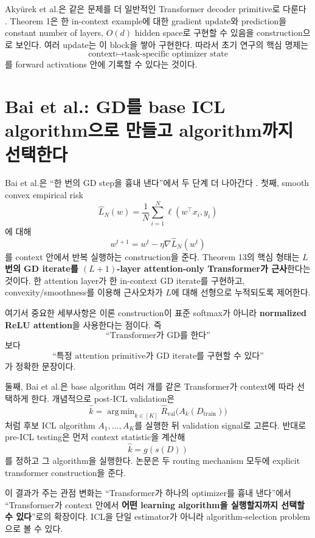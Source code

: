 \documentclass[11pt,a4paper,oneside,openany]{memoir}
\DeclareMathOperator*{\argmin}{arg\,min}
\theoremstyle{definition}
\begin{document}
Aky\"urek et al.은 같은 문제를 더 일반적인 Transformer decoder primitive로 다룬다 \cite{akyurek2023}. Theorem 1은 한 in-context example에 대한 gradient update와 prediction을 constant number of layers, $O(d)$ hidden space로 구현할 수 있음을 construction으로 보인다. 여러 update는 이 block을 쌓아 구현한다. 따라서 초기 연구의 핵심 명제는
\[
\text{context} \longmapsto \text{task-specific optimizer state}
\]
를 forward activations 안에 기록할 수 있다는 것이다.

\section{Bai et al.: GD를 base ICL algorithm으로 만들고 algorithm까지 선택한다}

Bai et al.은 ``한 번의 GD step을 흉내 낸다''에서 두 단계 더 나아간다 \cite{bai2023}.
첫째, smooth convex empirical risk
\[
\widehat L_N(w)
=\frac1N\sum_{i=1}^N\ell(w^\top x_i,y_i)
\]
에 대해
\[
w^{t+1}=w^t-\eta\nabla\widehat L_N(w^t)
\]
를 context 안에서 반복 실행하는 construction을 준다. Theorem 13의 핵심 형태는 \textbf{$L$번의 GD iterate를 $(L+1)$-layer attention-only Transformer가 근사}한다는 것이다. 한 attention layer가 한 in-context GD iterate를 구현하고, convexity/smoothness를 이용해 근사오차가 $L$에 대해 선형으로 누적되도록 제어한다.

여기서 중요한 세부사항은 이론 construction이 표준 softmax가 아니라 \textbf{normalized ReLU attention}을 사용한다는 점이다. 즉
\[
\text{``Transformer가 GD를 한다''}
\]
보다
\[
\text{``특정 attention primitive가 GD iterate를 구현할 수 있다''}
\]
가 정확한 문장이다.

둘째, Bai et al.은 base algorithm 여러 개를 같은 Transformer가 context에 따라 선택하게 한다. 개념적으로 post-ICL validation은
\[
\widehat k
=\argmin_{k\in[K]}
\widehat R_{\mathrm{val}}
\bigl(A_k(D_{\mathrm{train}})\bigr)
\]
처럼 후보 ICL algorithm $A_1,\ldots,A_K$를 실행한 뒤 validation signal로 고른다. 반대로 pre-ICL testing은 먼저 context statistic을 계산해
\[
\widehat k=g(s(D))
\]
를 정하고 그 algorithm을 실행한다. 논문은 두 routing mechanism 모두에 explicit transformer construction을 준다.

\begin{keybox}
이 결과가 주는 관점 변화는 ``Transformer가 하나의 optimizer를 흉내 낸다''에서 ``Transformer가 context 안에서 \textbf{어떤 learning algorithm을 실행할지까지 선택할 수 있다}''로의 확장이다. ICL을 단일 estimator가 아니라 algorithm-selection problem으로 볼 수 있다.
\end{keybox}
\end{document}
